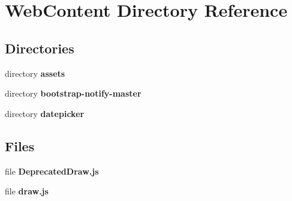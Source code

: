 \section{Web\-Content Directory Reference}
\label{dir_67b7886300b1c849145369d3a4902809}
\subsection*{Directories}
\begin{DoxyCompactItemize}
\item 
directory {\bf assets}
\item 
directory {\bf bootstrap-\/notify-\/master}
\item 
directory {\bf datepicker}
\end{DoxyCompactItemize}
\subsection*{Files}
\begin{DoxyCompactItemize}
\item 
file {\bf Deprecated\-Draw.\-js}
\item 
file {\bf draw.\-js}
\end{DoxyCompactItemize}
